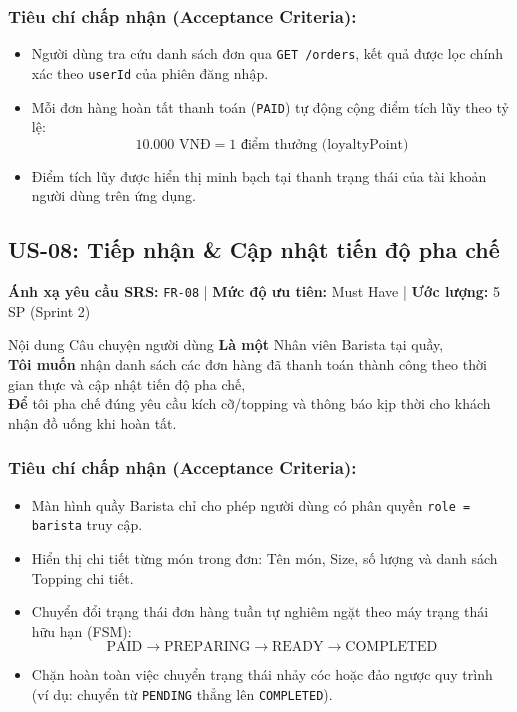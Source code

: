 \documentclass[12pt,a4paper]{article}
\begin{document}
\subsubsection*{Tiêu chí chấp nhận (Acceptance Criteria):}
\begin{itemize}[noitemsep]
    \item[\textbf{AC-07.1}] Người dùng tra cứu danh sách đơn qua \texttt{GET /orders}, kết quả được lọc chính xác theo \texttt{userId} của phiên đăng nhập.
    \item[\textbf{AC-07.2}] Mỗi đơn hàng hoàn tất thanh toán (\texttt{PAID}) tự động cộng điểm tích lũy theo tỷ lệ:
    \[ 10.000\text{ VNĐ} = 1\text{ điểm thưởng (loyaltyPoint)} \]
    \item[\textbf{AC-07.3}] Điểm tích lũy được hiển thị minh bạch tại thanh trạng thái của tài khoản người dùng trên ứng dụng.
\end{itemize}

\vspace{0.3cm}
\subsection{US-08: Tiếp nhận \& Cập nhật tiến độ pha chế}
\textbf{Ánh xạ yêu cầu SRS:} \texttt{FR-08} \quad | \quad \textbf{Mức độ ưu tiên:} Must Have \quad | \quad \textbf{Ước lượng:} 5 SP (Sprint 2)

\begin{storybox}{Nội dung Câu chuyện người dùng}
\textbf{Là một} Nhân viên Barista tại quầy,\\
\textbf{Tôi muốn} nhận danh sách các đơn hàng đã thanh toán thành công theo thời gian thực và cập nhật tiến độ pha chế,\\
\textbf{Để} tôi pha chế đúng yêu cầu kích cỡ/topping và thông báo kịp thời cho khách nhận đồ uống khi hoàn tất.
\end{storybox}

\subsubsection*{Tiêu chí chấp nhận (Acceptance Criteria):}
\begin{itemize}[noitemsep]
    \item[\textbf{AC-08.1}] Màn hình quầy Barista chỉ cho phép người dùng có phân quyền \texttt{role = barista} truy cập.
    \item[\textbf{AC-08.2}] Hiển thị chi tiết từng món trong đơn: Tên món, Size, số lượng và danh sách Topping chi tiết.
    \item[\textbf{AC-08.3}] Chuyển đổi trạng thái đơn hàng tuần tự nghiêm ngặt theo máy trạng thái hữu hạn (FSM):
    \[ \text{PAID} \longrightarrow \text{PREPARING} \longrightarrow \text{READY} \longrightarrow \text{COMPLETED} \]
    \item[\textbf{AC-08.4}] Chặn hoàn toàn việc chuyển trạng thái nhảy cóc hoặc đảo ngược quy trình (ví dụ: chuyển từ \texttt{PENDING} thẳng lên \texttt{COMPLETED}).
\end{itemize}
\end{document}
